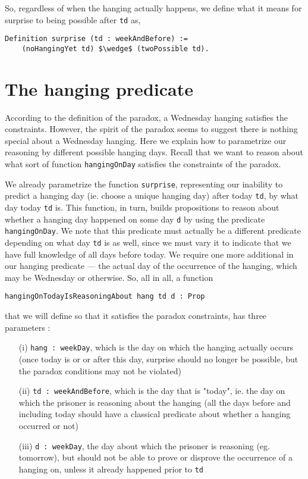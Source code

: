 \documentclass[runningheads]{llncs}
\begin{document}
So, regardless of when the hanging actually happens, we define what it means
for surprise to being possible after {\tt td} as,

\begin{lstlisting}[mathescape=true]
  Definition surprise (td : weekAndBefore) :=
    (noHangingYet td) $\wedge$ (twoPossible td).
\end{lstlisting}

\section{The hanging predicate}
\label{sec:predicate}

According to the definition of the paradox, a Wednesday hanging satisfies
the constraints. However, the spirit of the paradox seems to suggest there is nothing
special about a Wednesday hanging. Here we explain how to parametrize our reasoning
by different possible hanging days. Recall that we want to reason about what sort of
function {\tt hangingOnDay} satisfies the constraints of the paradox.

We already parametrize the function {\tt surprise},
representing our inability to predict a hanging day (ie. choose a unique hanging day)
after today {\tt td}, by what day today {\tt td} is. This function, in turn, builds propositions
to reason about whether a hanging day happened on some day {\tt d} by using the
predicate {\tt hangingOnDay}. We note that this predicate must actually be a different
predicate depending on what day {\tt td} is as well, since we must vary it to
indicate that we have full knowledge of all days before today.
We require one more additional in our hanging predicate --- the
actual day of the occurrence of the hanging, which may be Wednesday or otherwise.
So, all in all, a function

{\tt hangingOnTodayIsReasoningAbout hang td d : Prop}

that we will define so that it satisfies the paradox constraints, has three parameters :

\begin{itemize}
  \item[(i)] {\tt hang : weekDay}, which is the day on which the hanging actually occurs
  (once today is or or after this day, surprise should no longer be possible, but the paradox
  conditions may not be violated)
  \item[(ii)] {\tt td : weekAndBefore}, which is the day that is "today", ie. the day
  on which the prisoner is reasoning about the hanging (all the days before and including today
  should have a classical predicate about whether a hanging occurred or not)
  \item[(iii)] {\tt d : weekDay}, the day about which the prisoner is reasoning (eg.
  tomorrow), but should not be able to prove or disprove the occurrence of a hanging on,
  unless it already happened prior to {\tt td}
\end{itemize}
\end{document}
